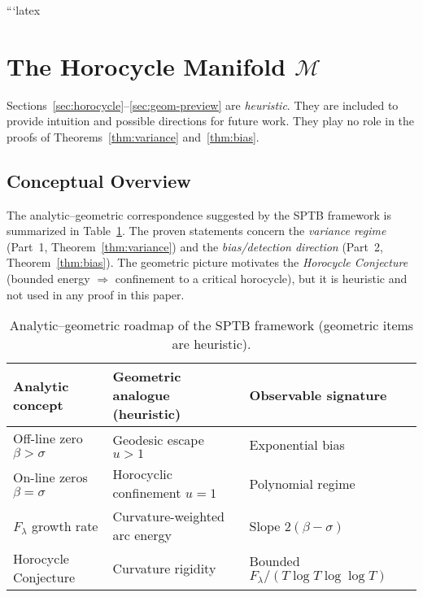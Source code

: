 ```latex

\section{The Horocycle Manifold \texorpdfstring{$\mathcal{M}$}{M}}

\begin{remark}
Sections~\ref{sec:horocycle}–\ref{sec:geom-preview} are \emph{heuristic}.
They are included to provide intuition and possible directions for future work.
They play no role in the proofs of Theorems~\ref{thm:variance} and~\ref{thm:bias}.
\end{remark}

\subsection{Conceptual Overview}

The analytic--geometric correspondence suggested by the SPTB framework is
summarized in Table~\ref{tab:roadmap}. The proven statements concern the
\emph{variance regime} (Part~1, Theorem~\ref{thm:variance}) and the
\emph{bias/detection direction} (Part~2, Theorem~\ref{thm:bias}). The
geometric picture motivates the \emph{Horocycle Conjecture}
(bounded energy $\Rightarrow$ confinement to a critical horocycle), but it is
heuristic and not used in any proof in this paper.

\begin{table}[h]
\centering
\caption{Analytic–geometric roadmap of the SPTB framework (geometric items are heuristic).}
\label{tab:roadmap}
\begin{tabular}{lll}
\toprule
Analytic concept & Geometric analogue (heuristic) & Observable signature \\
\midrule
Off-line zero $\beta>\sigma$ & Geodesic escape $u>1$ & Exponential bias \\
On-line zeros $\beta=\sigma$ & Horocyclic confinement $u=1$ & Polynomial regime \\
$F_\lambda$ growth rate & Curvature-weighted arc energy & Slope $2(\beta-\sigma)$ \\
Horocycle Conjecture & Curvature rigidity & Bounded $F_\lambda/(T\log T\log\log T)$ \\
\bottomrule
\end{tabular}
\end{table}

